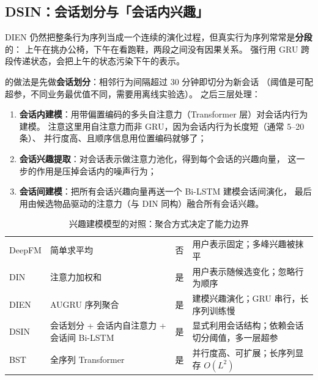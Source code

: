\subsection{DSIN：会话划分与「会话内兴趣」}

DIEN 仍然把整条行为序列当成一个连续的演化过程，但真实行为序列常常是\textbf{分段}的：
上午在挑办公椅，下午在看跑鞋，两段之间没有因果关系。
强行用 GRU 跨段传递状态，会把上午的状态污染下午的表示。

 \cite{pi2020dsin}
的做法是先做\textbf{会话划分}：相邻行为间隔超过 30 分钟即切分为新会话
（阈值是可配超参，不同业务最优值不同，需要用离线实验选）。
之后三层处理：

\begin{enumerate}
  \item \textbf{会话内建模}：用带偏置编码的多头自注意力（Transformer 层）对会话内行为建模。
        注意这里用自注意力而非 GRU，因为会话内行为长度短（通常 5--20 条）、
        并行度高、且顺序信息用位置编码就够了；
  \item \textbf{会话兴趣提取}：对会话表示做注意力池化，得到每个会话的兴趣向量，
        这一步的作用是压掉会话内的噪声行为；
  \item \textbf{会话间建模}：把所有会话兴趣向量再送一个 Bi-LSTM 建模会话间演化，
        最后用由候选物品驱动的注意力（与 DIN 同构）融合所有会话兴趣。
\end{enumerate}

\begin{table}[htbp]
\centering
\caption{兴趣建模模型的对照：聚合方式决定了能力边界}
\label{tab:interest-models}
\small
\begin{tabularx}{\textwidth}{L{1.5cm} L{2.6cm} L{2.3cm} Y}
\toprule
{} &  &  &  \\
\midrule
DeepFM & 简单求平均 & 否 & 用户表示固定；多峰兴趣被抹平 \\
\addlinespace
DIN & 注意力加权和 & 是 & 用户表示随候选变化；忽略行为顺序 \\
\addlinespace
DIEN & AUGRU 序列聚合 & 是 & 建模兴趣演化；GRU 串行，长序列训练慢 \\
\addlinespace
DSIN & 会话划分 + 会话内自注意力 + 会话间 Bi-LSTM & 是 & 显式利用会话结构；依赖会话切分阈值，多一层超参 \\
\addlinespace
BST & 全序列 Transformer & 是 & 并行度高、可扩展；长序列显存 $O(L^2)$ \\
\bottomrule
\end{tabularx}
\end{table}

